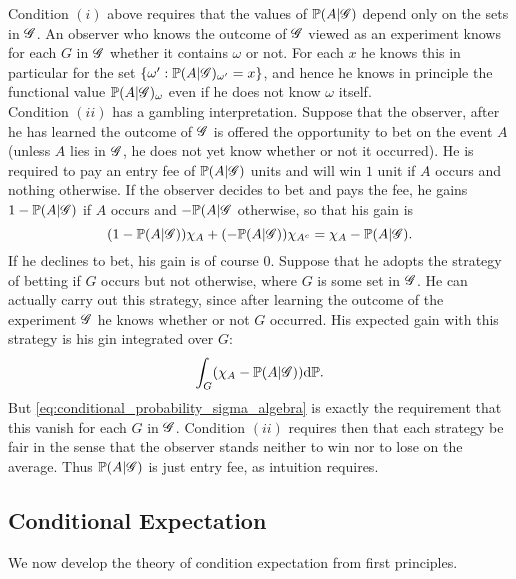 Condition $(i)$ above requires that the values of $\mathbb{P}(A|\mathcal{G})$ depend only on the sets in $\mathcal{G}$. An observer who knows the outcome of $\mathcal{G}$ viewed as an experiment knows for each $G$ in $\mathcal{G}$ whether it contains $\omega$ or not. For each $x$ he knows this in particular for the set $\{\omega' : \mathbb{P}(A|\mathcal{G})_{\omega'} = x\}$, and hence he knows in principle the functional value $\mathbb{P}(A|\mathcal{G})_\omega$ even if he does not know $\omega$ itself.\\

Condition $(ii)$ has a gambling interpretation. Suppose that the observer, after he has learned the outcome of $\mathcal{G}$ is offered the opportunity to bet on the event $A$ (unless $A$ lies in $\mathcal{G}$, he does not yet know whether or not it occurred). He is required to pay an entry fee of $\mathbb{P}(A|\mathcal{G})$ units and will win $1$ unit if $A$ occurs and nothing otherwise. If the observer decides to bet and pays the fee, he gains $1 - \mathbb{P}(A|\mathcal{G})$ if $A$ occurs and $-\mathbb{P}(A | \mathcal{G}$ otherwise, so that his gain is 
\begin{equation*}
    (1 - \mathbb{P}(A | \mathcal{G})) \chi_A + (-\mathbb{P}(A|\mathcal{G}))\chi_{A^c} = \chi_A - \mathbb{P}(A | \mathcal{G}).
\end{equation*}
If he declines to bet, his gain is of course $0$. Suppose that he adopts the strategy of betting if $G$ occurs but not otherwise, where $G$ is some set in $\mathcal{G}$. He can actually carry out this strategy, since after learning the outcome of the experiment $\mathcal{G}$ he knows whether or not $G$ occurred. His expected gain with this strategy is his gin integrated over $G$:
\begin{equation*}
    \int_G (\chi_A - \mathbb{P}(A | \mathcal{G})) \mathrm{d} \mathbb{P}.
\end{equation*}
But \eqref{eq:conditional_probability_sigma_algebra} is exactly the requirement that this vanish for each $G$ in $\mathcal{G}$. Condition $(ii)$ requires then that each strategy be fair in the sense that the observer stands neither to win nor to lose on the average. Thus $\mathbb{P}(A | \mathcal{G})$ is just entry fee, as intuition requires.\\


\subsection{Conditional Expectation}
We now develop the theory of condition expectation from first principles. 

